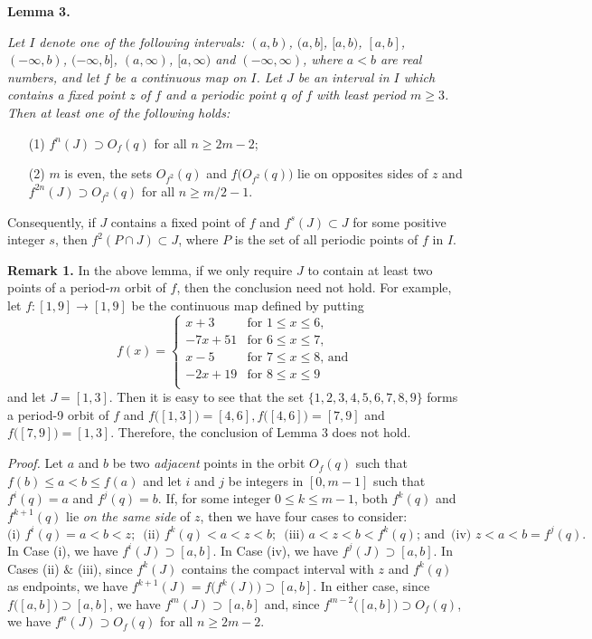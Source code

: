 \documentclass[12pt]{article}
\begin{document}
\noindent
{\bf Lemma 3.} 
{\it Let $I$ denote one of the following intervals: $(a, b)$, $(a, b]$, $[a, b)$, $[a, b]$, $(-\infty, b)$, $(-\infty, b]$, $(a, \infty)$, $[a, \infty)$ and $(-\infty, \infty)$, where $a < b$ are real numbers, and let $f$ be a continuous map on $I$.  Let $J$ be an interval in $I$ which contains a fixed point $z$ of $f$ and a periodic point $q$ of $f$ with least period $m \ge 3$.  Then at least one of the following holds:
\begin{itemize}
\item[{\rm (1)}]
$f^n(J) \supset O_f(q)$ for all $n \ge 2m-2$;

\item[{\rm (2)}]
$m$ is even, the sets $O_{f^2}(q)$ and $f\big(O_{f^2}(q)\big)$ lie on opposites sides of $z$ and $f^{2n}(J) \supset O_{f^2}(q)$ for all $n \ge m/2 - 1$.
\end{itemize}
\noindent
Consequently, if $J$ contains a fixed point of $f$ and $f^s(J) \subset J$ for some positive integer $s$, then $f^2(P \cap J) \subset J$, where $P$ is the set of all periodic points of $f$ in $I$.}
\noindent

\noindent
{\bf Remark 1.} 
In the above lemma, if we only require $J$ to contain at least two points of a period-$m$ orbit of $f$, then the conclusion need not hold.  For example, let $f : [1, 9] \to [1, 9]$ be the continuous map defined by putting 
$$
f(x) = \begin{cases}
       x + 3 & \text{for $1 \le x \le 6$}, \\
       -7x + 51 & \text{for $6 \le x \le 7$}, \\
       x - 5 & \text{for $7 \le x \le 8$, and} \\ 
       -2x + 19 & \text{for $8 \le x \le 9$} \\
       \end{cases}
$$and let $J = [1, 3]$.  Then it is easy to see that the set $\{ 1, 2, 3, 4, 5, 6, 7, 8, 9 \}$ forms a period-9 orbit of $f$ and $f\big([1, 3]\big) = [4, 6], f\big([4, 6]\big) = [7, 9]$ and $f\big([7, 9]\big) = [1, 3]$.  Therefore, the conclusion of Lemma 3 does not hold.  

\noindent
{\it Proof.}
Let $a$ and $b$ be two {\it adjacent} points in the orbit $O_f(q)$ such that $f(b) \le a < b \le f(a)$ and let $i$ and $j$ be integers in $[0, m-1]$ such that $f^i(q) = a$ and $f^j(q) = b$.  If, for some integer $0 \le k \le m-1$, both $f^k(q)$ and $f^{k+1}(q)$ lie {\it on the same side} of $z$, then we have four cases to consider: $$\text{(i)} \,\, f^i(q) = a < b < z; \,\,\, \text{(ii)} \,\, f^k(q) < a < z < b; \,\,\, \text{(iii)} \,\, a < z < b < f^k(q); \, \text{and} \,\,\, \text{(iv)} \,\, z < a < b = f^j(q).$$In Case (i), we have $f^i(J) \supset [a, b]$.  In Case (iv), we have $f^j(J) \supset [a, b]$.  In Cases (ii) $\&$ (iii), since $f^k(J)$ contains the compact interval with $z$ and $f^k(q)$ as endpoints, we have $f^{k+1}(J) = f\big(f^k(J)\big) \supset [a, b]$.  In either case, since $f\big([a, b]\big) \supset [a, b]$, we have $f^m(J) \supset [a, b]$ and, since $f^{m-2}\big([a, b]\big) \supset O_f(q)$, we have $f^n(J) \supset O_f(q)$ for all $n \ge 2m-2$.  
\end{document}
